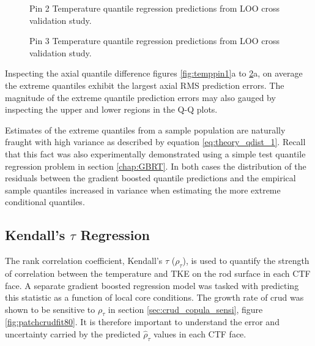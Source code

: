 \begin{figure}[H]%
    \centering
    \qquad
    \caption[Q-Q LOO Temperature pin 2 results.]{Pin 2 Temperature quantile regression predictions from LOO cross validation study.}%
    \label{fig:temppin2}%
\end{figure}

\begin{figure}[H]%
    \centering
    \qquad
    \caption[Q-Q LOO Temperature pin 3 results.]{Pin 3 Temperature quantile regression predictions from LOO cross validation study.}%
    \label{fig:temppin3}%
\end{figure}

Inspecting the axial quantile difference figures \ref{fig:temppin1}a to \ref{fig:temppin3}a, on average the extreme quantiles exhibit the largest axial RMS prediction errors.  The magnitude of the extreme quantile prediction errors may also gauged by inspecting the upper and lower regions in the Q-Q plots.

Estimates of the extreme quantiles from a sample population are naturally fraught with high variance as described by equation \ref{eq:theory_qdist_1}.  Recall that this fact was also experimentally demonstrated using a simple test quantile regression problem in section \ref{chap:GBRT}.  In both cases the distribution of the residuals between the gradient boosted quantile predictions and the empirical sample quantiles increased in variance when estimating the more extreme conditional quantiles.


\subsection{Kendall's $\tau$ Regression}

The rank correlation coefficient, Kendall's $\tau$ ($\rho_\tau$), is used to quantify the strength of correlation between the temperature and TKE on the rod surface in each CTF face.  A separate gradient boosted regression model was tasked with predicting this statistic as a function of local core conditions.   The growth rate of crud was shown to be sensitive to   $\rho_\tau$ in section \ref{sec:crud_copula_sensi}, figure \ref{fig:patchcrudfit80}.  It is therefore important to understand the error and uncertainty carried by the predicted $\hat \rho_\tau$ values in each CTF face.

